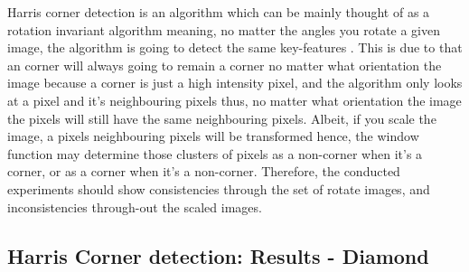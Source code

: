 \documentclass[conference]{IEEEtran}
\begin{document}
Harris corner detection is an algorithm which can be mainly thought of as a rotation invariant algorithm meaning, no matter the angles you rotate a given image, the algorithm is going to detect the same key-features \cite{b2} \cite{b4}. This is due to that an corner will always going to remain a corner no matter what orientation the image because a corner is just a high intensity pixel, and the algorithm only looks at a pixel and it's neighbouring pixels thus, no matter what orientation the image the pixels will still have the same neighbouring pixels\cite{b2}. Albeit, if you scale the image, a pixels neighbouring pixels will be transformed hence, the window function may determine those clusters of pixels as a non-corner when it's a corner, or as a corner when it's a non-corner. Therefore, the conducted experiments should show consistencies through the set of rotate images, and inconsistencies through-out the scaled images.

\newpage
\clearpage
\subsection{Harris Corner detection: Results - Diamond}\label{one-results}
\end{document}
